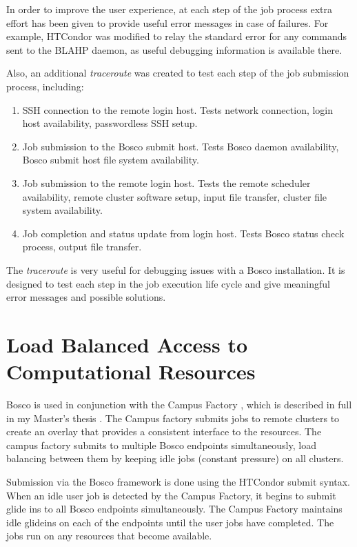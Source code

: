 In order to improve the user experience, at each step of the job process extra effort has been given to provide useful error messages in case of failures.  For example, HTCondor was modified to relay the standard error for any commands sent to the BLAHP daemon, as useful debugging information is available there.  

Also, an additional \emph{traceroute} was created to test each step of the job submission process, including:

\begin{enumerate}
\item SSH connection to the remote login host.  Tests network connection, login host availability, passwordless SSH setup.
\item Job submission to the Bosco submit host.  Tests Bosco daemon availability, Bosco submit host file system availability.
\item Job submission to the remote login host.  Tests the remote scheduler availability, remote cluster software setup, input file transfer, cluster file system availability.
\item Job completion and status update from login host.  Tests Bosco status check process, output file transfer.
\end{enumerate}

The \emph{traceroute} is very useful for debugging issues with a Bosco installation.  It is designed to test each step in the job execution life cycle and give meaningful error messages and possible solutions.

\section{Load Balanced Access to Computational Resources}

Bosco is used in conjunction with the Campus Factory \cite{website:campusfactory}, which is described in full in my Master's thesis \cite{weitzel2011campus}.  The Campus factory submits jobs to remote clusters to create an overlay that provides a consistent interface to the resources.  The campus factory submits to multiple Bosco endpoints simultaneously, load balancing between them by keeping idle jobs (constant pressure) on all clusters.

Submission via the Bosco framework is done using the HTCondor submit syntax.  When an idle user job is detected by the Campus Factory, it begins to submit glide ins to all Bosco endpoints simultaneously.  The Campus Factory maintains idle glideins on each of the endpoints until the user jobs have completed.  The jobs run on any resources that become available.


